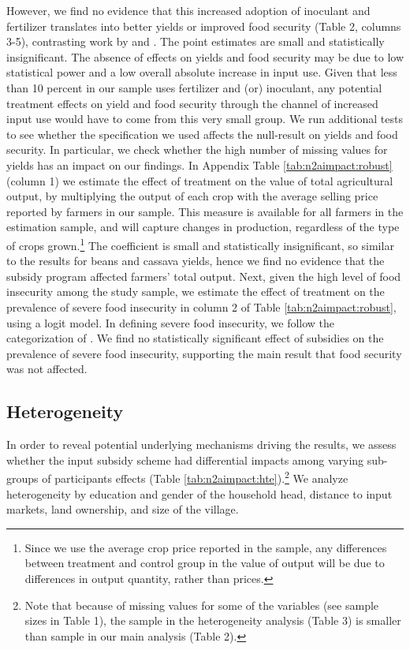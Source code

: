 However, we find no evidence that this increased adoption of inoculant and fertilizer translates into better yields or improved food security (Table 2, columns 3-5), contrasting work by \cite{Carter2014} and \cite{Brune2016}. The point estimates are small and statistically insignificant. The absence of effects on yields and food security may be due to low statistical power and a low overall absolute increase in input use. Given that less than 10 percent in our sample uses fertilizer and (or) inoculant, any potential treatment effects on yield and food security through the channel of increased input use would have to come from this very small group.
We run additional tests to see whether the specification we used affects the null-result on yields and food security. In particular, we check whether the high number of missing values for yields has an impact on our findings. In Appendix Table \ref{tab:n2aimpact:robust} (column 1) we estimate the effect of treatment on the value of total agricultural output, by multiplying the output of each crop with the average selling price reported by farmers in our sample. This measure is available for all farmers in the estimation sample, and will capture changes in production, regardless of the type of crops grown.\footnote{Since we use the average crop price reported in the sample, any differences between treatment and control group in the value of output will be due to differences in output quantity, rather than prices.} The coefficient is small and statistically insignificant, so similar to the results for beans and cassava yields, hence we find no evidence that the subsidy program affected farmers’ total output. Next, given the high level of food insecurity among the study sample, we estimate the effect of treatment on the prevalence of severe food insecurity in column 2 of Table \ref{tab:n2aimpact:robust}, using a logit model. In defining severe food insecurity, we follow the categorization of \cite{Coates2007}. We find no statistically significant effect of subsidies on the prevalence of severe food insecurity, supporting the main result that food security was not affected.



\subsection{Heterogeneity}
In order to reveal potential underlying mechanisms driving the results, we assess whether the input subsidy scheme had differential impacts among varying sub-groups of participants effects (Table \ref{tab:n2aimpact:hte}).\footnote{Note that because of missing values for some of the variables (see sample sizes in Table 1), the sample in the heterogeneity analysis (Table 3) is smaller than sample in our main analysis (Table 2).}  We analyze heterogeneity by education and gender of the household head, distance to input markets, land ownership, and size of the village. 

